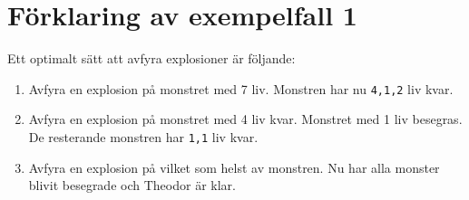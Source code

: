 \section*{Förklaring av exempelfall 1}
Ett optimalt sätt att avfyra explosioner är följande:
\begin{enumerate}
  \item Avfyra en explosion på monstret med 7 liv. Monstren har nu \verb+4,1,2+ liv kvar.
  \item Avfyra en explosion på monstret med 4 liv kvar. Monstret med 1 liv besegras. De resterande monstren har \verb+1,1+ liv kvar. 
  \item Avfyra en explosion på vilket som helst av monstren. Nu har alla monster blivit besegrade och Theodor är klar.
\end{enumerate}
